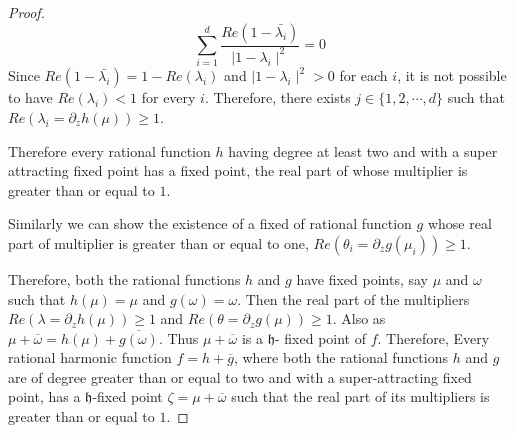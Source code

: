 \documentclass[10pt,a4paper]{amsart}
\begin{document}
\begin{proof}
\begin{equation}\label{E4}
\displaystyle\sum_{i=1}^{d}\frac{Re(1-\bar{\lambda_{i}})}{\mid 1-\lambda_{i}
\mid^{2}}=0 
\end{equation}
Since $Re(1-\bar{\lambda_{i}})=1-Re(\lambda_{i})$ and $\mid 1-\lambda_{i}\mid^{2}>0$ for each $i$, it is not possible to have $Re(\lambda_{i})<1$ for every $i$. Therefore, there exists $j\in\lbrace1,2,\cdots,d\rbrace$ such that $Re\left( \lambda_{i}=\partial_{z}h(\mu)\right)\geq 1$.

Therefore every rational function $h$ having degree at least two and with a super attracting fixed point has a fixed point, the real part of whose multiplier is greater than or equal to $1$.

Similarly we can show the existence of a fixed of rational function $g$ whose real part of multiplier is greater than or equal to one, $Re\left( \theta_{i}=\partial_{z}g(\mu_{i})\right)\geq 1$.


 
 Therefore, both the rational functions $h$ and $g$ have fixed points, say $\mu$ and $\omega$ such that $h(\mu)=\mu$ and $g(\omega)=\omega$. Then the real part of the multipliers  $Re\left( \lambda=\partial_{z}h(\mu)\right)\geq 1$ and $Re\left( \theta=\partial_{z}g(\mu)\right)\geq 1$. Also as $\mu+\overline{\omega}=h(\mu)+\overline{g(\omega)}$. Thus $\mu+\overline{\omega}$ is a $\mathfrak{h}$- fixed point of $f$. Therefore,   Every rational harmonic function $f=h+\overline{g}$, where both the rational functions $h$ and $g$ are of degree greater than or equal to two and with a super-attracting fixed point, has a $\mathfrak{h}$-fixed point  $\zeta=\mu+\overline{\omega}$ such that the real part of its multipliers is greater than or equal to $1$.
\end{proof}
\end{document}
